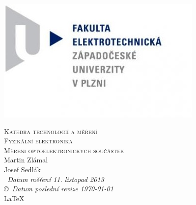 \documentclass[12pt]{article} %
\newcommand{\bigsize}{\fontsize{35pt}{20pt}\selectfont}
\begin{document}
\begin{titlepage}
	\includegraphics[scale=0.7]{logo.jpg}
	\vspace*{\fill}
	\begin{center}
		\textsc{\LARGE Katedra technologií a měření}\\[0.3cm]
		\textsc{\LARGE \bigsize Fyzikální elektronika}\\[0.3cm]
		\textsc{\LARGE Měření optoelektronických součástek}\\[1cm]
		Martin Zlámal \\
		Josef Sedlák \\[1cm]
		{\small\em \ Datum měření 11. listopad 2013 } \\
		{\small\em \copyright \ Datum poslední revize \today } \\
		\LaTeX
	\end{center}
	\vspace*{\fill}
\end{titlepage}
\tableofcontents
\listoffigures
\listoftables
\newpage
\end{document}
